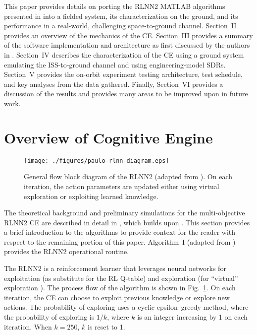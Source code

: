 \documentclass[journal]{IEEEtran}
\let\MYoriglatexcaption\caption
\renewcommand{\caption}[2][\relax]{\MYoriglatexcaption[#2]{#2}}
\begin{document}
\IEEEpubidadjcol

This paper provides details on porting the RLNN2 MATLAB algorithms presented in \cite{paulo-jrnl} into a fielded system, its characterization on the ground, and its performance in a real-world, challenging space-to-ground channel.  Section~II provides an overview of the mechanics of the CE.  Section~III provides a summary of the software implementation and architecture as first discussed by the authors in \cite{tim-ccaa}.  Section~IV describes the characterization of the CE using a ground system emulating the ISS-to-ground channel and using engineering-model SDRs.  Section~V provides the on-orbit experiment testing architecture, test schedule, and key analyses from the data gathered.  Finally, Section~VI provides a discussion of the results and provides many areas to be improved upon in future work.

\section{Overview of Cognitive Engine} \label{sec:overview}
\begin{figure}[t]
\centering
 \texttt{[image: ./figures/paulo-rlnn-diagram.eps]}
 \caption{General flow block diagram of the RLNN2 (adapted from \cite{paulo-jrnl}).  On each iteration, the action parameters are updated either using virtual exploration or exploiting learned knowledge.}
 \label{fig:paulo-rlnn-diagram}
\end{figure}

The theoretical background and preliminary simulations for the multi-objective RLNN2 CE are described in detail in \cite{paulo-jrnl}, which builds upon \cite{paulo-ccaa-paper,aiaa-paulo}.  This section provides a brief introduction to the algorithms to provide context for the reader with respect to the remaining portion of this paper.  Algorithm~I (adapted from \cite{paulo-jrnl}) provides the RLNN2 operational routine.

The RLNN2 is a reinforcement learner that leverages neural networks for exploitation (as substitute for the RL Q-table) and exploration (for ``virtual'' exploration \cite{paulo-jrnl,paulo-ccaa-paper}).  The process flow of the algorithm is shown in Fig.~\ref{fig:paulo-rlnn-diagram}.  On each iteration, the CE can choose to exploit previous knowledge or explore new actions.  The probability of exploring uses a cyclic epsilon--greedy method, where the probability of exploring is $1/k$, where $k$ is an integer increasing by 1 on each iteration.  When $k=250$, $k$ is reset to 1.
\end{document}
